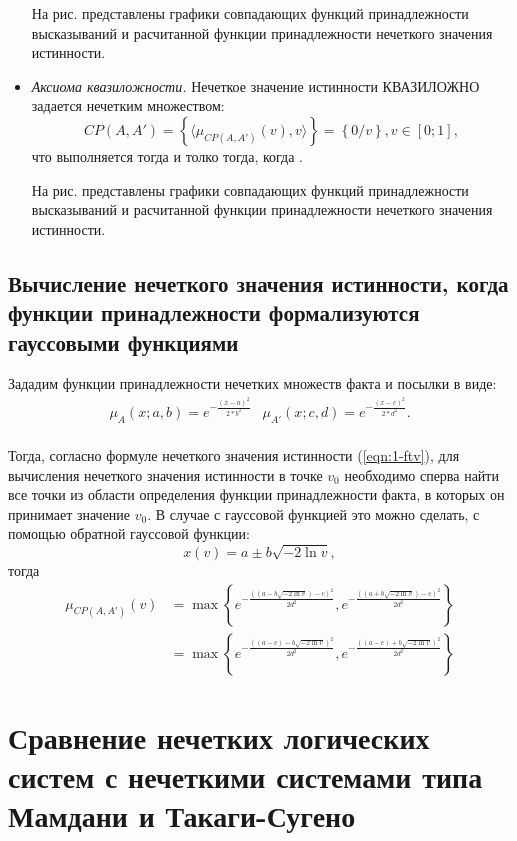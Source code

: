 \begin{itemize}
На рис. представлены графики совпадающих функций принадлежности высказываний и расчитанной функции принадлежности нечеткого значения истинности.
\item \textit{Аксиома квазиложности.} Нечеткое значение истинности КВАЗИЛОЖНО задается нечетким множеством:
\begin{equation*} 
CP(A,A') = \left\{\langle\mu_{CP(A,A')}(v), v\rangle\right\} = \left\{0/v\right\}, v \in [0; 1],
\end{equation*}
что выполняется тогда и толко тогда, когда .

На рис. представлены графики совпадающих функций принадлежности высказываний и расчитанной функции принадлежности нечеткого значения истинности.
\end{itemize}

\subsection{Вычисление нечеткого значения истинности, когда функции принадлежности формализуются гауссовыми функциями}

Зададим функции принадлежности нечетких множеств факта и посылки в виде:
\begin{equation*}
\begin{aligned}
\mu_{A}(x; a, b) = e^{-\frac{(x-a)^2}{2*b^2}} & \mu_{A'}(x; c, d) = e^{-\frac{(x-c)^2}{2*d^2}}. \\
\end{aligned}
\end{equation*}

Тогда, согласно формуле нечеткого значения истинности (\ref{eqn:1-ftv}), для вычисления нечеткого значения истинности в точке $v_0$ необходимо сперва найти все точки из области определения функции принадлежности факта, в которых он принимает значение $v_0$. В случае с гауссовой функцией это можно сделать, с помощью обратной гауссовой функции:
\begin{equation*}
x(v) = a \pm b\sqrt{-2\ln{v}},
\end{equation*}
тогда
\begin{align*}
\mu_{CP(A, A')}(v) &= \max\left\{e^{-\frac{((a - b\sqrt{-2\ln v})-c)^2}{2 d^2}},e^{-\frac{((a + b\sqrt{-2\ln v})-c)^2}{2 d^2}}\right\} \\
&= \max\left\{e^{-\frac{((a-c) - b\sqrt{-2\ln v})^2}{2 d^2}},e^{-\frac{((a-c) + b\sqrt{-2\ln v})^2}{2 d^2}}\right\}
\end{align*}

\section{Сравнение нечетких логических систем с нечеткими системами типа Мамдани и Такаги-Сугено}


